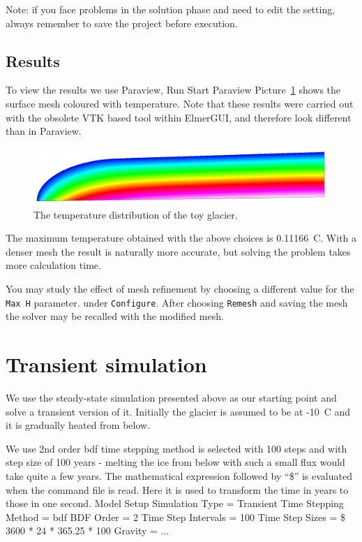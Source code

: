 Note: if you face problems in the solution phase and need to edit the setting, always remember to save
the project before execution.

\subsection*{Results}

To view the results we use Paraview,
\ttbegin
Run
  Start Paraview
\ttend
Picture~\ref{glac:figtemp} shows
the surface mesh coloured with temperature.
Note that these results were carried out with the obsolete
VTK based tool within ElmerGUI, and therefore look different than in Paraview.

\begin{figure}
\begin{center}
\includegraphics[width=120mm]{glacier_toy_temp}
\caption{The temperature distribution of the toy glacier.}\label{glac:figtemp}
\end{center}
\end{figure}


The maximum temperature obtained with the above choices is 0.11166~C. 
With a denser mesh the result is naturally more accurate, but solving the
 problem takes more calculation time.

You may study the effect of mesh refinement by choosing 
a different value for the \texttt{Max H} parameter.
under \texttt{Configure}. After choosing \texttt{Remesh} and saving the mesh 
the solver may be recalled with the modified mesh.


\section*{Transient simulation}

We use the steady-state simulation presented above as our starting point and 
solve a transient version of it. Initially the glacier is assumed to be at -10~C 
and it is gradually heated from below. 


We use 2nd order bdf time stepping method is selected with 100 steps
and with step size of 100 years - melting the ice from below with such a small flux 
would take quite a few years. 
The mathematical expression followed 
by ``\$'' is evaluated when the command file is read.
Here it is used to transform the time in years to those in one second. 
\ttbegin
Model
  Setup 
    Simulation Type = Transient
    Time Stepping Method = bdf
    BDF Order = 2
    Time Step Intervals = 100
    Time Step Sizes = \$ 3600 * 24 * 365.25 * 100
    Gravity = ...
\ttend

